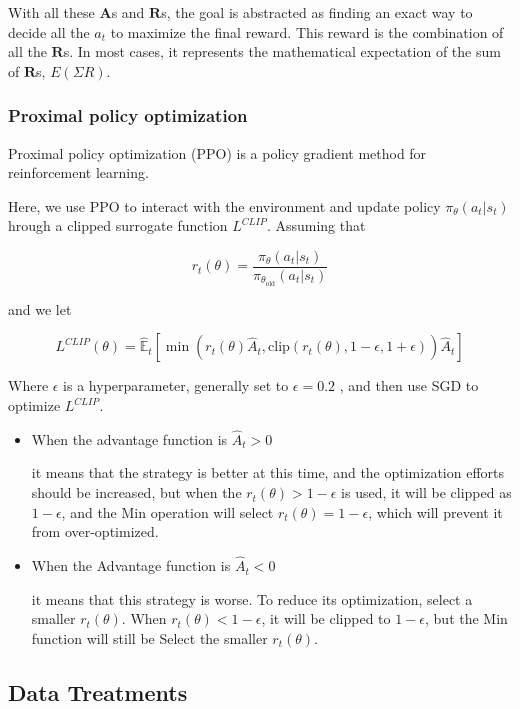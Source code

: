 \documentclass{mcmthesis}
\begin{document}
With all these $\pmb{A}$s and $\pmb{R}$s,
the goal is abstracted as finding an exact way to decide all the $a_t$
to maximize the final reward.
This reward is the combination of all the $\pmb{R}$s.
In most cases, it represents the mathematical expectation of the sum of $\pmb{R}$s,
$E(\Sigma R)$.

\subsubsection{Proximal policy optimization}

Proximal policy optimization (PPO) is a policy gradient method for reinforcement learning.

Here, we use PPO to interact with the environment and update policy $\pi_\theta(a_t | s_t)$ hrough a clipped surrogate function $L^{CLIP}$. Assuming that

\[
r_t(\theta) = \frac{\pi_{\theta}(a_t | s_t)}{\pi_{\theta_{\mathrm{old}}}(a_t | s_t)}
\]

and we let

\[
  L^{CLIP}(\theta) = \hat{\mathbb{E}}_t \left[ \min \left(r_t(\theta) \hat{A}_t, \mathrm{clip}(r_t(\theta), 1 - \epsilon, 1 + \epsilon)\right) \hat{A}_t \right] 
\]

Where $\epsilon$ is a hyperparameter, generally set to $\epsilon = 0.2$ , and then use SGD to optimize $L^{CLIP}$.

\begin{itemize}
  \item When the advantage function is $\hat{A}_t > 0$ \par 
  it means that the strategy is better at this time, and the optimization efforts should be increased, but when the $r_t(\theta) > 1 - \epsilon$ is used, it will be clipped as $1 - \epsilon$, and the Min operation will select $r_t(\theta) = 1 - \epsilon$, which will prevent it from over-optimized. 
  \item When the Advantage function is $\hat{A}_t < 0$ \par 
  it means that this strategy is worse. To reduce its optimization, select a smaller $r_t(\theta)$. When $r_t(\theta) < 1 - \epsilon$, it will be clipped to $1 - \epsilon$, but the Min function will still be Select the smaller $r_t(\theta)$. 

\end{itemize}

\subsection{Data Treatments}
\end{document}
